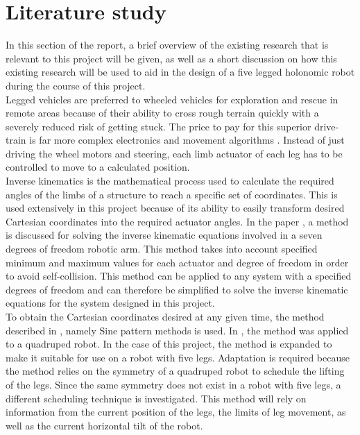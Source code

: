 
\section{Literature study}
\label{section:Lit}
In this section of the report, a brief overview of the existing research that is relevant to this project will be given, as well as a short discussion on how this existing research will be used to aid in the design of a five legged holonomic robot during the course of this project.\\

Legged vehicles are preferred to wheeled vehicles for exploration and rescue in remote areas because of their ability to cross rough terrain quickly with a severely reduced risk of getting stuck. The price to pay for this superior drive-train is far more complex electronics and movement algorithms \cite{Hidayat:Autonomous}. Instead of just driving the wheel motors and steering, each limb actuator of each leg has to be controlled to move to a calculated position.\\ 

Inverse kinematics is the mathematical process used to calculate the required angles of the limbs of a structure to reach a specific set of coordinates. This is used extensively in this project because of its ability to easily transform desired Cartesian coordinates into the required actuator angles. In the paper \cite{Oh:Analytic}, a method is discussed for solving the inverse kinematic equations involved in a seven degrees of freedom robotic arm. This method takes into account specified minimum and maximum values for each actuator and degree of freedom in order to avoid self-collision. This method can be applied to any system with a specified degrees of freedom and can therefore be simplified to solve the inverse kinematic equations for the system designed in this project.\\

To obtain the Cartesian coordinates desired at any given time, the method described in \cite{Hidayat:Autonomous}, namely Sine pattern methods is used. In \cite{Hidayat:Autonomous}, the method was applied to a quadruped robot. In the case of this project, the method is expanded to make it suitable for use on a robot with five legs. Adaptation is required because the method relies on the symmetry of a quadruped robot to schedule the lifting of the legs. Since the same symmetry does not exist in a robot with five legs, a different scheduling technique is investigated. This method will rely on information from the current position of the legs, the limits of leg movement, as well as the current horizontal tilt of the robot.\\

